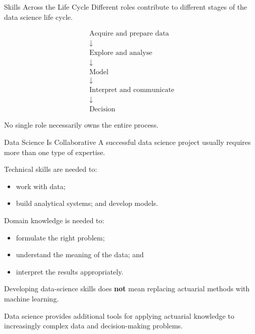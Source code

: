 \documentclass[
  ignorenonframetext,
  aspectratio=169,
]{beamer}
\providecommand{\tightlist}{%
  \setlength{\itemsep}{0pt}\setlength{\parskip}{0pt}}
\begin{document}
\begin{frame}{Skills Across the Life Cycle}
\protect{}\label{skills-across-the-life-cycle}
Different roles contribute to different stages of the data science life
cycle.

\[
\begin{array}{c}
\text{Acquire and prepare data}
\\
\downarrow
\\
\text{Explore and analyse}
\\
\downarrow
\\
\text{Model}
\\
\downarrow
\\
\text{Interpret and communicate}
\\
\downarrow
\\
\text{Decision}
\end{array}
\]

No single role necessarily owns the entire process.
\end{frame}

\begin{frame}{Data Science Is Collaborative}
\protect{}\label{data-science-is-collaborative}
A successful data science project usually requires more than one type of
expertise.

Technical skills are needed to:

\begin{itemize}
\tightlist
\item
  work with data;
\item
  build analytical systems; and develop models.
\end{itemize}

Domain knowledge is needed to:

\begin{itemize}
\tightlist
\item
  formulate the right problem;
\item
  understand the meaning of the data; and
\item
  interpret the results appropriately.
\end{itemize}

\begin{tcolorbox}[enhanced jigsaw, arc=.35mm, bottomrule=.15mm, bottomtitle=1mm, breakable, colback=white, colbacktitle=quarto-callout-note-color!10!white, colframe=quarto-callout-note-color-frame, coltitle=black, left=2mm, leftrule=.75mm, opacityback=0, opacitybacktitle=0.6, rightrule=.15mm, title=\textcolor{quarto-callout-note-color}{\faInfo}\hspace{0.5em}{For actuarial students}, titlerule=0mm, toprule=.15mm, toptitle=1mm]

Developing data-science skills does \textbf{not} mean replacing
actuarial methods with machine learning.

Data science provides additional tools for applying actuarial knowledge
to increasingly complex data and decision-making problems.

\end{tcolorbox}
\end{frame}
\end{document}
